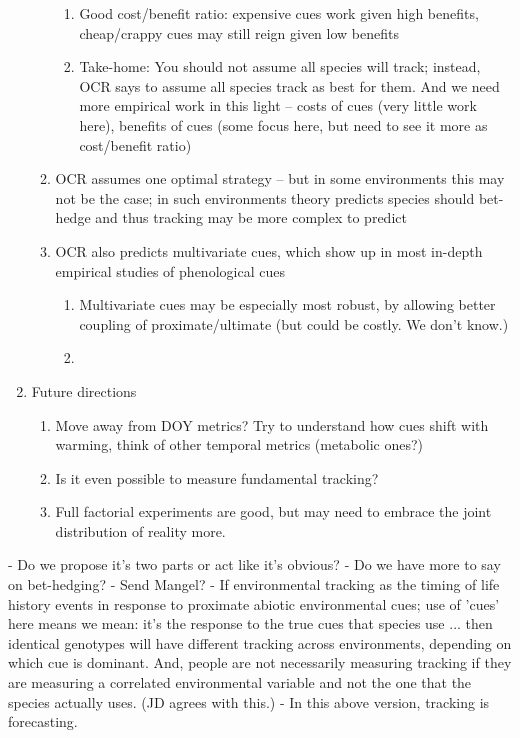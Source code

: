 \documentclass[11pt,letterpaper]{article}
\begin{document}
\begin{enumerate}
\begin{enumerate}
\begin{enumerate}
\item Good cost/benefit ratio: expensive cues work given high benefits, cheap/crappy cues may still reign given low benefits
\item Take-home: You should not assume all species will track; instead, OCR says to assume all species track as best for them. And we need more empirical work in this light -- costs of cues (very little work here), benefits of cues (some focus here, but need to see it more as cost/benefit ratio)
\end{enumerate}
\item OCR assumes one optimal strategy -- but in some environments this may not be the case; in such environments theory predicts species should bet-hedge and thus tracking may be more complex to predict
\item OCR also predicts multivariate cues, which show up in most in-depth empirical studies of phenological cues 
\begin{enumerate}
\item Multivariate cues may be especially most robust, by allowing better coupling of proximate/ultimate (but could be costly. We don't know.)
\item 
\end{enumerate}
\end{enumerate}
\item Future directions
\begin{enumerate}
\item Move away from DOY metrics? Try to understand how cues shift with warming, think of other temporal metrics (metabolic ones?)
\item Is it even possible to measure fundamental tracking?
\item Full factorial experiments are good, but may need to embrace the joint distribution of reality more.
\end{enumerate}
\end{enumerate}



- Do we propose it's two parts or act like it's obvious?
- Do we have more to say on bet-hedging?
- Send Mangel?
- If environmental tracking as the timing of life history events in response to proximate abiotic environmental cues; use of 'cues' here means we mean: it's the response to the true cues that species use ... then identical genotypes will have different tracking across environments, depending on which cue is dominant. And, people are not necessarily measuring tracking if they are measuring a correlated environmental variable and not the one that the species actually uses. (JD agrees with this.)
- In this above version, tracking is forecasting. 
\end{document}
